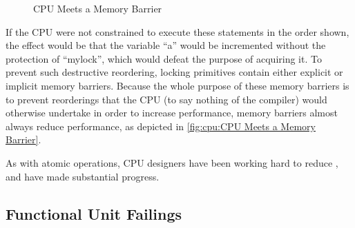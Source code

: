 \begin{figure}
\centering
{}
\caption{CPU Meets a Memory Barrier}
\end{figure}

If the CPU were not constrained to execute these statements in the order
shown, the effect would be that the variable ``a'' would be incremented
without the protection of ``mylock'', which would defeat the purpose of
acquiring it.
To prevent such destructive reordering, locking primitives contain
either explicit or implicit memory barriers.
Because the whole purpose of these memory barriers is to prevent
reorderings that the CPU (to say nothing of the compiler) would otherwise
undertake in order to increase performance, memory barriers almost always
reduce performance, as depicted in
\cref{fig:cpu:CPU Meets a Memory Barrier}.

As with atomic operations, CPU designers have been working hard to
reduce , and have made substantial progress.

\subsection{Functional Unit Failings}
\label{sec:cpu:Functional Unit Failings}

